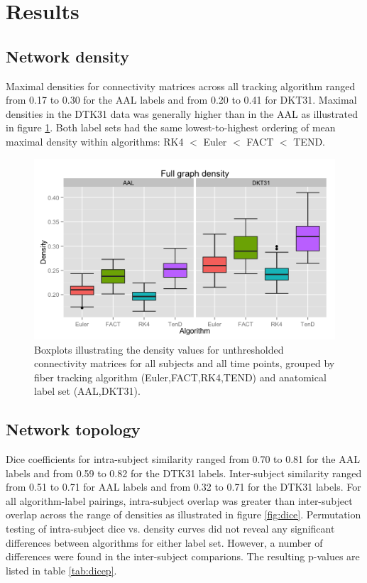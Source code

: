 \documentclass{frontiersSCNS} %
\begin{document}

\section{Results}
\subsection{Network density}
Maximal densities for connectivity matrices across all tracking
algorithm ranged from 0.17 to 0.30 for the AAL labels and from 0.20 to
0.41 for DKT31. Maximal densities in the DTK31 data was generally
higher than in the AAL as illustrated in figure
\ref{fig:density}. Both label sets had the same lowest-to-highest
ordering of mean maximal density within algorithms: RK4 $<$ Euler $<$
FACT $<$ TEND.


\begin{figure}
\begin{center}
\includegraphics[width=0.5\linewidth]{figures/density_plot.png} 
\caption{Boxplots illustrating the density values for unthresholded connectivity matrices for all subjects and all time points, grouped by fiber tracking algorithm (Euler,FACT,RK4,TEND) and anatomical label set (AAL,DKT31).}
\label{fig:density}
\end{center}
\end{figure}

\subsection{Network topology}
Dice coefficients for intra-subject similarity ranged from 0.70 to
0.81 for the AAL labels and from 0.59 to 0.82 for the DTK31
labels. Inter-subject similarity ranged from 0.51 to 0.71 for AAL
labels and from 0.32 to 0.71 for the DTK31 labels. For all
algorithm-label pairings, intra-subject overlap was greater than
inter-subject overlap across the range of densities as illustrated in
figure \ref{fig:dice}. Permutation testing of intra-subject dice
vs. density curves did not reveal any significant differences between
algorithms for either label set. However, a number of differences were
found in the inter-subject comparions. The resulting p-values are
listed in table \ref{tab:dicep}. 
\end{document}
